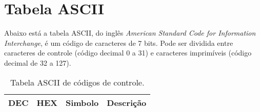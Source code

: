 \chapter{Tabela ASCII}%
\label{chap:anex-tabela-ascii}

Abaixo está a tabela ASCII, do inglês \emph{American Standard Code for
  Information Interchange}, é um código de caracteres de 7 bits. Pode ser
dividida entre caracteres de controle (código decimal 0 a 31) e caracteres
imprimíveis (código decimal de 32 a 127).

{ \footnotesize%

  \begin{longtable}[c]{c c c l}
    \caption{Tabela ASCII de códigos de controle.}
    \label{tab:tabela-ascii-ctrl}
    \\
  
    \hline %
    \hline %
    \textbf{DEC} & \textbf{HEX} & \textbf{Simbolo} & \textbf{Descrição}
    \\
    \hline %
    \hline %


\end{longtable}}
